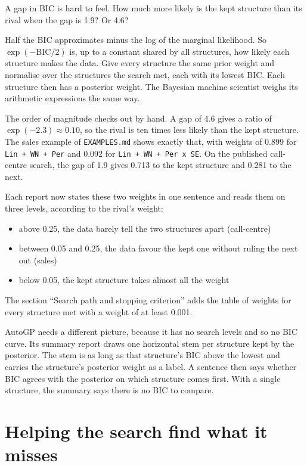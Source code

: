 \documentclass[
]{article}
\providecommand{\tightlist}{%
  \setlength{\itemsep}{0pt}\setlength{\parskip}{0pt}}
\begin{document}
A gap in BIC is hard to feel. How much more likely is the kept structure
than its rival when the gap is 1.9? Or 4.6?

Half the BIC approximates minus the log of the marginal likelihood. So
\(\exp(-\mathrm{BIC}/2)\) is, up to a constant shared by all structures,
how likely each structure makes the data. Give every structure the same
prior weight and normalise over the structures the search met, each with
its lowest BIC. Each structure then has a posterior weight. The Bayesian
machine scientist \autocite{guimera2020bms} weighs its arithmetic
expressions the same way.

The order of magnitude checks out by hand. A gap of 4.6 gives a ratio of
\(\exp(-2.3) \approx 0.10\), so the rival is ten times less likely than
the kept structure. The sales example of \texttt{EXAMPLES.md} shows
exactly that, with weights of 0.899 for \texttt{Lin\ +\ WN\ +\ Per} and
0.092 for \texttt{Lin\ +\ WN\ +\ Per\ x\ SE}. On the published
call-centre search, the gap of 1.9 gives 0.713 to the kept structure and
0.281 to the next.

Each report now states these two weights in one sentence and reads them
on three levels, according to the rival's weight:

\begin{itemize}
\tightlist
\item
  above 0.25, the data barely tell the two structures apart
  (call-centre)
\item
  between 0.05 and 0.25, the data favour the kept one without ruling the
  next out (sales)
\item
  below 0.05, the kept structure takes almost all the weight
\end{itemize}

The section ``Search path and stopping criterion'' adds the table of
weights for every structure met with a weight of at least 0.001.

AutoGP needs a different picture, because it has no search levels and so
no BIC curve. Its summary report draws one horizontal stem per structure
kept by the posterior. The stem is as long as that structure's BIC above
the lowest and carries the structure's posterior weight as a label. A
sentence then says whether BIC agrees with the posterior on which
structure comes first. With a single structure, the summary says there
is no BIC to compare.

\section{Helping the search find what it
misses}\label{helping-the-search-find-what-it-misses}
\end{document}
